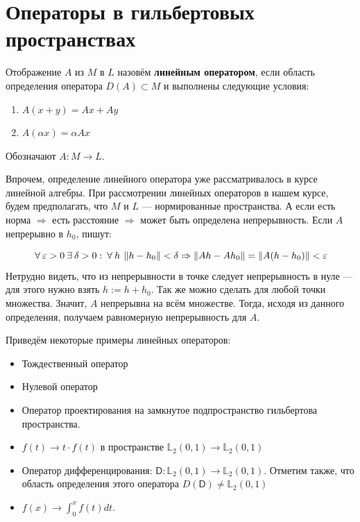 \documentclass[12pt]{article}
\begin{document}
\section{Операторы в гильбертовых пространствах}

	
	\begin{defi}
		Отображение $A$ из $M$ в $L$ назовём \textbf{линейным оператором}, если область определения оператора
		$D(A) \subset M$ и выполнены следующие условия:
		\begin{enumerate}
			\item $A(x + y) = Ax + Ay$
			\item $A(\alpha x) = \alpha A x$ 
		\end{enumerate}
		Обозначают $A : M \rightarrow L$.
	\end{defi}
	
	Впрочем, определение линейного оператора уже рассматривалось в курсе линейной алгебры. При рассмотрении линейных операторов в
	нашем курсе, будем предполагать, что $M$ и $L$ --- нормированные пространства. А если есть норма $\Rightarrow$ есть расстояние
	$\Rightarrow$ может быть определена непрерывность. Если $A$ непрерывно в $h_0$, пишут:
	
	$$ \forall \varepsilon > 0 \exists \delta > 0 : \forall h \: \norm{h - h_0} < \delta \Rightarrow \norm{Ah - Ah_0} 
	= \norm{A(h-h_0)} < \varepsilon $$
	Нетрудно видеть, что из непрерывности в точке следует непрерывность в нуле --- для этого нужно взять $h := h + h_0$. 
	Так же можно сделать для любой точки множества. Значит, $A$ непрерывна на всём множестве. Тогда, исходя из данного
	определения, получаем равномерную непрерывность для $A$.
	
	Приведём некоторые примеры линейных операторов:
	\begin{itemize}
		\item Тождественный оператор
		\item Нулевой оператор
		\item Оператор проектирования на замкнутое подпространство гильбертова пространства.
		\item $f(t) \rightarrow t \cdot f(t)$ в пространстве $\mathbb{L}_2 (0,1) \rightarrow \mathbb{L}_2 (0,1)$
		\item Оператор дифференцирования: $\mathsf{D}: \mathbb{L}_2 (0,1) \rightarrow \mathbb{L}_2 (0,1)$. Отметим также, что
		область определения этого оператора $D(\mathsf{D}) \neq \mathbb{L}_2 (0,1)$
		\item $f(x) \rightarrow \int_0^x f(t) dt$.
	\end{itemize}
	
\end{document}
